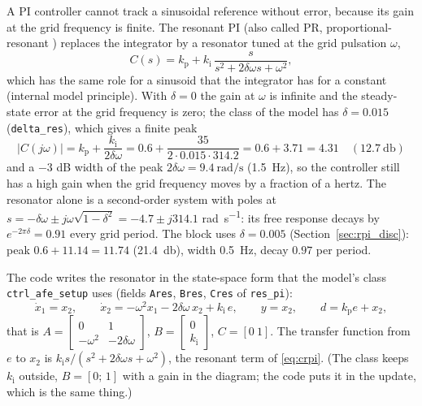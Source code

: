 \documentclass[11pt,a4paper]{scrartcl}
\newcommand{\ped}[1]{_{\mathrm{#1}}}
\newcommand{\code}[1]{\texttt{#1}}
\begin{document}
\begin{onehalfspace}
A PI controller cannot track a sinusoidal reference without error, because its gain at the grid frequency is finite. The resonant PI (also called PR, proportional-resonant \cite{teodorescu2006}) replaces the integrator by a resonator tuned at the grid pulsation $\omega$,
\begin{equation}
	C(s) = k\ped{p} + k\ped{i}\, \frac{s}{s^2 + 2\delta\omega s + \omega^2},
	\label{eq:crpi}
\end{equation}
which has the same role for a sinusoid that the integrator has for a constant (internal model principle). With $\delta = 0$ the gain at $\omega$ is infinite and the steady-state error at the grid frequency is zero; the class of the model has $\delta = 0.015$ (\code{delta\_res}), which gives a finite peak
\begin{equation}
	|C(j\omega)| = k\ped{p} + \frac{k\ped{i}}{2\delta\omega} = 0.6 + \frac{35}{2 \cdot 0.015 \cdot 314.2} = 0.6 + 3.71 = 4.31 \quad (\SI{12.7}{\decibel})
	\label{eq:peak}
\end{equation}
and a $-3$ dB width of the peak $2\delta\omega = \SI{9.4}{\radian\per\second}$ (\SI{1.5}{\hertz}), so the controller still has a high gain when the grid frequency moves by a fraction of a hertz. The resonator alone is a second-order system with poles at $s = -\delta\omega \pm j\omega\sqrt{1 - \delta^2} = -4.7 \pm j314.1$ \si{\radian\per\second}: its free response decays by $e^{-2\pi\delta} = 0.91$ every grid period. The block uses $\delta = 0.005$ (Section~\ref{sec:rpi_disc}): peak $0.6 + 11.14 = 11.74$ (\SI{21.4}{\decibel}), width \SI{0.5}{\hertz}, decay $0.97$ per period.

The code writes the resonator in the state-space form that the model's class \code{ctrl\_afe\_setup} uses (fields \code{Ares}, \code{Bres}, \code{Cres} of \code{res\_pi}):
\begin{equation}
	\dot{x}_1 = x_2, \qquad \dot{x}_2 = -\omega^2 x_1 - 2\delta\omega\, x_2 + k\ped{i}\, e, \qquad y = x_2, \qquad d = k\ped{p} e + x_2,
	\label{eq:ss}
\end{equation}
that is $A = \begin{bmatrix} 0 & 1 \\ -\omega^2 & -2\delta\omega \end{bmatrix}$, $B = \begin{bmatrix} 0 \\ k\ped{i} \end{bmatrix}$, $C = [0\ 1]$. The transfer function from $e$ to $x_2$ is $k\ped{i} s/(s^2 + 2\delta\omega s + \omega^2)$, the resonant term of \eqref{eq:crpi}. (The class keeps $k\ped{i}$ outside, $B = [0;\,1]$ with a gain in the diagram; the code puts it in the update, which is the same thing.)


\end{onehalfspace}
\end{document}
